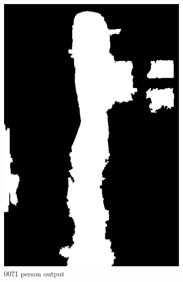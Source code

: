 \documentclass{csc_assignment5}
\begin{document}
\begin{description}
\begin{figure}[h!]
    \centering
    \begin{subfigure}[b]{0.3\textwidth}
        \includegraphics[width=\textwidth]{results-seg/0071_person.png}
        \caption{0071 person output}
    \end{subfigure}
    \quad
    \begin{subfigure}[b]{0.3\textwidth}

\end{subfigure}
\end{figure}
\end{description}
\end{document}
